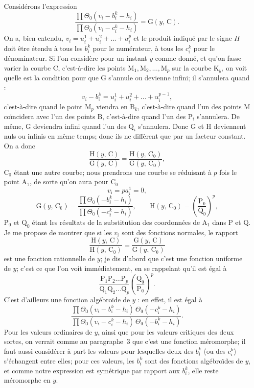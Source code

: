 \documentclass{article}
\begin{document}
Considérons l'expression
\[
\frac{\prod \Theta_{0}(v_{i} - b_{i}^{k} - h_{i})}{\prod \Theta_{0}(v_{i} - c_{i}^{k} - h_{i})} = \mathrm{G}(y,\, \mathrm{C}).
\]
On a, bien entendu, $v_{i} = u_{i}^{1} + u_{i}^{2} + \ldots + u_{i}^{p}$ et le produit indiqué par le signe $\Pi$ doit être étendu à tous les $b_{i}^{k}$ pour le numérateur, à tous les $c_{i}^{k}$ pour le dénominateur. Si l'on considère pour un instant $y$ comme donné, et qu'on fasse varier la courbe $\mathrm{C}$, c'est-à-dire les points $\mathrm{M}_{1}, \mathrm{M}_{2}, \ldots, \mathrm{M}_{p}$ sur la courbe $\mathrm{K}_{y}$, on voit quelle est la condition pour que $\mathrm{G}$ s'annule ou devienne infini; il s'annulera quand :
\[
v_{i} - b_{i}^{k} = u_{i}^{1} + u_{i}^{2} + \ldots + u_{i}^{p-1},
\]
c'est-à-dire quand le point $\mathrm{M}_{p}$ viendra en $\mathrm{B}_{k}$, c'est-à-dire quand l'un des points $\mathrm{M}$ coïncidera avec l'un des points $\mathrm{B}$, c'est-à-dire quand l'un des $\mathrm{P}_{i}$ s'annulera. De même, $\mathrm{G}$ deviendra infini quand l'un des $\mathrm{Q}_{i}$ s'annulera. Donc $\mathrm{G}$
et $\mathrm{H}$ deviennent nuls ou infinis en même temps; donc ils ne diffèrent que par un facteur constant. On a donc
\[
\frac{\mathrm{H}(y,\, \mathrm{C})}{\mathrm{G}(y,\, \mathrm{C})} = \frac{\mathrm{H}(y,\, \mathrm{C}_{0})}{\mathrm{G}(y,\, \mathrm{C}_{0})},
\]
$\mathrm{C}_{0}$ étant une autre courbe; nous prendrons une courbe se réduisant à $p$ fois le point $\mathrm{A}_{1}$, de sorte qu'on aura pour $\mathrm{C}_{0}$
\[
v_{i} = p a_{i}^{1} = 0,
\]
\[
\mathrm{G}(y,\, \mathrm{C}_{0}) = \frac{\prod \Theta_{0}(- b_{i}^{k} - h_{i})}{\prod \Theta_{0}(- c_{i}^{k} - h_{i})}, \qquad \mathrm{H}(y,\, \mathrm{C}_{0}) = \left(\frac{\mathrm{P}_{0}}{\mathrm{Q}_{0}}\right)^{p},
\]
$\mathrm{P}_{0}$ et $\mathrm{Q}_{0}$ étant les résultats de la substitution des coordonnées de $\mathrm{A}_{1}$ dans $\mathrm{P}$ et $\mathrm{Q}$. Je me propose de montrer que si les $v_{i}$ sont des fonctions normales, le rapport
\[
\frac{\mathrm{H}(y,\, \mathrm{C})}{\mathrm{H}(y,\, \mathrm{C}_{0})} = \frac{\mathrm{G}(y,\, \mathrm{C})}{\mathrm{G}(y,\, \mathrm{C}_{0})}
\]
est une fonction rationnelle de $y$; je dis d'abord que c'est une fonction uniforme de $y$; c'est ce que l'on voit immédiatement, en se rappelant qu'il est égal à
\[
\frac{\mathrm{P}_{1}\mathrm{P}_{2}\ldots\mathrm{P}_{p}}{\mathrm{Q}_{1}\mathrm{Q}_{2}\ldots\mathrm{Q}_{p}}\left(\frac{\mathrm{Q}_{0}}{\mathrm{P}_{0}}\right)^{p}.
\]
C'est d'ailleurs une fonction algébroïde de $y$ : en effet, il est égal à
\[
\frac{\prod \Theta_{0}(v_{i} - b_{i}^{k} - h_{i})\,\Theta_{0}(- c_{i}^{k} - h_{i})}{\prod \Theta_{0}(v_{i} - c_{i}^{k} - h_{i})\,\Theta_{0}(- b_{i}^{k} - h_{i})}.
\]
Pour les valeurs ordinaires de $y$, ainsi que pour les valeurs critiques des deux sortes, on verrait comme au paragraphe~3 que c'est une fonction méromorphe; il faut aussi considérer à part les valeurs pour lesquelles deux des $b_{i}^{k}$ (ou des $c_{i}^{k}$) s'échangent entre elles; pour ces valeurs, les $b_{i}^{k}$ sont des fonctions algébroïdes de $y$, et comme notre expression est symétrique par rapport aux $b_{i}^{k}$, elle reste méromorphe en $y$.
\end{document}
